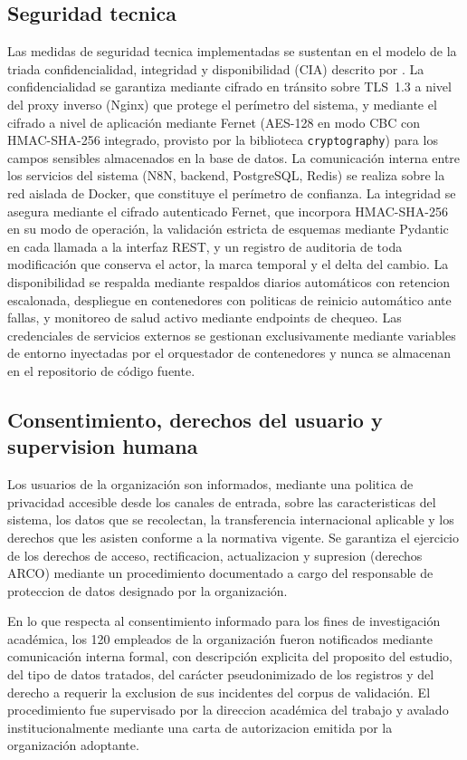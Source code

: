 \subsection{Seguridad tecnica}

Las medidas de seguridad tecnica implementadas se sustentan en el modelo de la triada confidencialidad, integridad y disponibilidad (CIA) descrito por \textcite{Stallings2017_computer_security}. La confidencialidad se garantiza mediante cifrado en tránsito sobre TLS~1.3 a nivel del proxy inverso (Nginx) que protege el perímetro del sistema, y mediante el cifrado a nivel de aplicación mediante Fernet (AES-128 en modo CBC con HMAC-SHA-256 integrado, provisto por la biblioteca \texttt{cryptography}) para los campos sensibles almacenados en la base de datos. La comunicación interna entre los servicios del sistema (N8N, backend, PostgreSQL, Redis) se realiza sobre la red aislada de Docker, que constituye el perímetro de confianza. La integridad se asegura mediante el cifrado autenticado Fernet, que incorpora HMAC-SHA-256 en su modo de operación, la validación estricta de esquemas mediante Pydantic en cada llamada a la interfaz REST, y un registro de auditoria de toda modificación que conserva el actor, la marca temporal y el delta del cambio. La disponibilidad se respalda mediante respaldos diarios automáticos con retencion escalonada, despliegue en contenedores con politicas de reinicio automático ante fallas, y monitoreo de salud activo mediante endpoints de chequeo. Las credenciales de servicios externos se gestionan exclusivamente mediante variables de entorno inyectadas por el orquestador de contenedores y nunca se almacenan en el repositorio de código fuente.

\subsection{Consentimiento, derechos del usuario y supervision humana}

Los usuarios de la organización son informados, mediante una politica de privacidad accesible desde los canales de entrada, sobre las caracteristicas del sistema, los datos que se recolectan, la transferencia internacional aplicable y los derechos que les asisten conforme a la normativa vigente. Se garantiza el ejercicio de los derechos de acceso, rectificacion, actualizacion y supresion (derechos ARCO) mediante un procedimiento documentado a cargo del responsable de proteccion de datos designado por la organización.

En lo que respecta al consentimiento informado para los fines de investigación académica, los 120 empleados de la organización fueron notificados mediante comunicación interna formal, con descripción explicita del proposito del estudio, del tipo de datos tratados, del carácter pseudonimizado de los registros y del derecho a requerir la exclusion de sus incidentes del corpus de validación. El procedimiento fue supervisado por la direccion académica del trabajo y avalado institucionalmente mediante una carta de autorizacion emitida por la organización adoptante.

